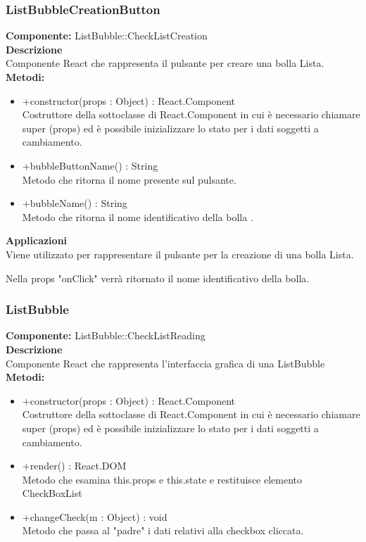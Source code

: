 \clearpage

\subsubsection{ListBubbleCreationButton}
\textbf{Componente:}  ListBubble::CheckListCreation\\
\textbf{Descrizione}\\
Componente React che rappresenta il pulsante per creare una bolla Lista.
\\
\textbf{Metodi:} 
\begin{itemize}
\item +constructor(props : Object) : React.Component 
\\
Costruttore della sottoclasse di React.Component in cui è necessario chiamare super (props) ed è possibile inizializzare lo stato per i dati soggetti a cambiamento.

\item +bubbleButtonName() : String 
\\
Metodo che ritorna il nome presente sul pulsante.

\item +bubbleName() : String 
\\
Metodo che ritorna il nome identificativo della bolla .

\end{itemize} 


\textbf{Applicazioni}\\
Viene utilizzato per rappresentare il pulsante per la creazione di una bolla Lista.

Nella props "onClick" verrà ritornato il nome identificativo della bolla. 


\clearpage

\subsubsection{ListBubble}
\textbf{Componente:}  ListBubble::CheckListReading\\
\textbf{Descrizione}\\
Componente React che rappresenta l'interfaccia grafica di una ListBubble
\\
\textbf{Metodi:} 
\begin{itemize}
\item +constructor(props : Object) : React.Component 
\\
Costruttore della sottoclasse di React.Component in cui è necessario chiamare super (props) ed è possibile inizializzare lo stato per i dati soggetti a cambiamento.

\item +render() : React.DOM 
\\
Metodo che esamina this.props e this.state e restituisce elemento CheckBoxList 

\item +changeCheck(m : Object) : void \\
Metodo che passa al "padre" i dati relativi alla checkbox cliccata.
\end{itemize} 



